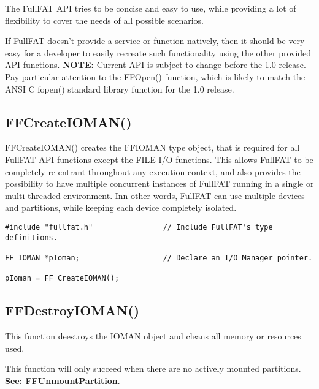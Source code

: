 The FullFAT API tries to be concise and easy to use, while providing a lot of flexibility to cover the needs of all possible scenarios.

If FullFAT doesn't provide a service or function natively, then it should be very easy for a developer to easily recreate such functionality using the other provided API functions.
\newline
\newline
\textbf{NOTE:} Current API is subject to change before the 1.0 release. Pay particular attention to the FF\textunderscore Open() function, which is likely to match the ANSI C fopen() standard library function for the 1.0 release.


\subsection{FF\textunderscore CreateIOMAN()}

FF\textunderscore CreateIOMAN() creates the FF\textunderscore IOMAN type object, that is required for all FullFAT API functions except the FILE I/O functions. This allows FullFAT to be completely re-entrant throughout any execution context, and also provides the possibility to have multiple concurrent instances of FullFAT running in a single or multi-threaded environment. Inn other words, FullFAT can use multiple devices and partitions, while keeping each device completely isolated.

\begin{lstlisting}
#include "fullfat.h" 				// Include FullFAT's type definitions.

FF_IOMAN *pIoman;					// Declare an I/O Manager pointer.

pIoman = FF_CreateIOMAN();

\end{lstlisting}


\subsection{FF\textunderscore DestroyIOMAN()}

This function deestroys the IOMAN object and cleans all memory or resources used.

This function will only succeed when there are no actively mounted partitions. \textbf{See: FF\textunderscore UnmountPartition}.
